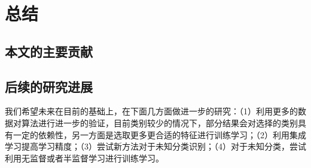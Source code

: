 \chapter{总结}
\section{本文的主要贡献}

\section{后续的研究进展}
我们希望未来在目前的基础上，在下面几方面做进一步的研究：（1）利用更多的数据对算法进行进一步的验证，目前类别较少的情况下，部分结果会对选择的类别具有一定的依赖性，另一方面是选取更多更合适的特征进行训练学习；（2）利用集成学习提高学习精度；（3）尝试新方法对于未知分类识别；（4）对于未知分类，尝试利用无监督或者半监督学习进行训练学习。
